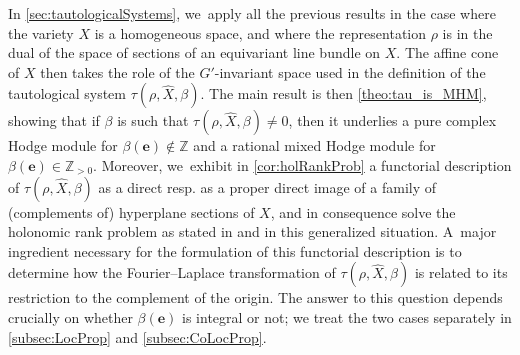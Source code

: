 \documentclass[11pt]{article}
\newcommand{\resp}{resp.\xspace}
\let\mathds\mathbb
\newcommand{\bme}{{\boldsymbol{e}}}
\newcommand{\dZ}{{\mathds Z}}\let\mbz\dZ\let\Z\dZ
\begin{document}
In \cref{sec:tautologicalSystems}, we~apply all the previous results in the case where the variety $X$ is a homogeneous space, and where the representation $\rho$ is in the dual of the space of sections of an equivariant line bundle on $X$. The affine cone of $X$ then takes the role of the $G'$-invariant space used in the definition of the tautological system $\tau(\rho,\hat{X},\beta)$. The main result is then \cref{theo:tau_is_MHM}, showing that if $\beta$ is such that $\tau(\rho,\hat{X},\beta)\neq 0$, then it underlies a pure complex Hodge module for $\beta(\bme)\notin \dZ$ and a rational mixed Hodge module for $\beta(\bme)\in \dZ_{>0}$. Moreover, we~exhibit in \cref{cor:holRankProb} a functorial description of $\tau(\rho,\hat{X},\beta)$ as a
direct \resp as a proper direct image of a family of (complements of) hyperplane sections of $X$, and in consequence solve the holonomic rank problem as stated in \cite{Bloch_HolRankProb} and \cite{HuangLianZhu} in this generalized situation. A~major ingredient necessary for the formulation of this functorial description is to determine how the Fourier--Laplace transformation of $\tau(\rho,\hat{X},\beta)$ is related to its restriction to the complement of the origin. The answer to this question depends crucially on whether $\beta(\bme)$ is integral or not; we treat the two cases separately in \cref{subsec:LocProp} and \cref{subsec:CoLocProp}.
\end{document}
